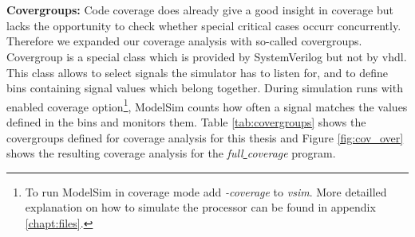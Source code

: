 \\\\
\textbf{Covergroups:}
Code coverage does already give a good insight in coverage but lacks the opportunity to check whether special critical cases occurr concurrently. Therefore we expanded our coverage analysis with so-called covergroups. Covergroup is a special class which is provided by SystemVerilog but not by \gls{vhdl}. This class allows to select signals the simulator has to listen for, and to define bins containing signal values which belong together. \cite{SVG} During simulation runs with enabled coverage option\footnote{To run ModelSim in coverage mode add \textit{-coverage} to \textit{vsim}. More detailled explanation on how to simulate the processor can be found in appendix \ref{chapt:files}.}, ModelSim counts how often a signal matches the values defined in the bins and monitors them.
Table \ref{tab:covergroups} shows the covergroups defined for coverage analysis for this thesis and Figure \ref{fig:cov_over} shows the resulting coverage analysis for the \textit{full\underline{ }coverage} program.

